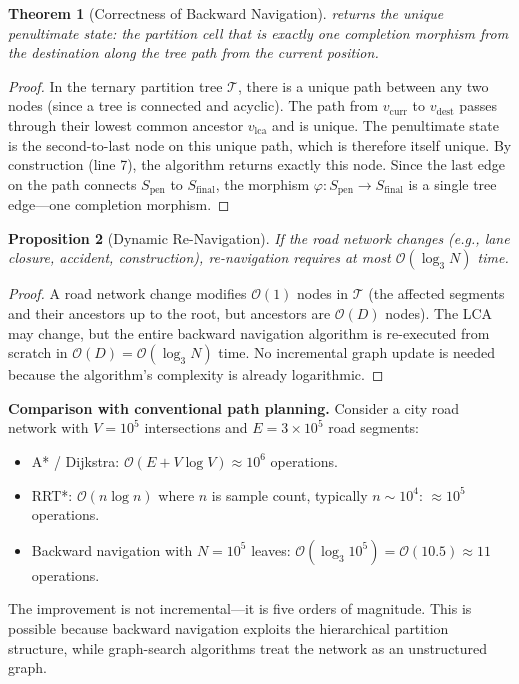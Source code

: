 \documentclass[twocolumn,10pt]{article}
\newtheorem{theorem}{Theorem}[section]
\newtheorem{proposition}[theorem]{Proposition}
\theoremstyle{definition}
\newcommand{\Sfinal}{S_{\mathrm{final}}}
\newcommand{\Spen}{S_{\mathrm{pen}}}
\newcommand{\BigO}{\mathcal{O}}
\begin{document}
\begin{theorem}[Correctness of Backward Navigation]
\label{thm:nav-correctness}
 returns the unique penultimate state: the partition cell that is exactly one completion morphism from the destination along the tree path from the current position.
\end{theorem}

\begin{proof}
In the ternary partition tree $\mathcal{T}$, there is a unique path between any two nodes (since a tree is connected and acyclic). The path from $v_{\mathrm{curr}}$ to $v_{\mathrm{dest}}$ passes through their lowest common ancestor $v_{\mathrm{lca}}$ and is unique. The penultimate state is the second-to-last node on this unique path, which is therefore itself unique. By construction (line 7), the algorithm returns exactly this node. Since the last edge on the path connects $\Spen$ to $\Sfinal$, the morphism $\varphi: \Spen \to \Sfinal$ is a single tree edge---one completion morphism.
\end{proof}

\begin{proposition}[Dynamic Re-Navigation]
\label{prop:dynamic-renav}
If the road network changes (e.g., lane closure, accident, construction), re-navigation requires at most $\BigO(\log_3 N)$ time.
\end{proposition}

\begin{proof}
A road network change modifies $\BigO(1)$ nodes in $\mathcal{T}$ (the affected segments and their ancestors up to the root, but ancestors are $\BigO(D)$ nodes). The LCA may change, but the entire backward navigation algorithm is re-executed from scratch in $\BigO(D) = \BigO(\log_3 N)$ time. No incremental graph update is needed because the algorithm's complexity is already logarithmic.
\end{proof}

\textbf{Comparison with conventional path planning.} Consider a city road network with $V = 10^5$ intersections and $E = 3 \times 10^5$ road segments:
\begin{itemize}[leftmargin=*]
\item A* / Dijkstra: $\BigO(E + V \log V) \approx 10^6$ operations.
\item RRT*: $\BigO(n \log n)$ where $n$ is sample count, typically $n \sim 10^4$: $\approx 10^5$ operations.
\item Backward navigation with $N = 10^5$ leaves: $\BigO(\log_3 10^5) = \BigO(10.5) \approx 11$ operations.
\end{itemize}
The improvement is not incremental---it is five orders of magnitude. This is possible because backward navigation exploits the hierarchical partition structure, while graph-search algorithms treat the network as an unstructured graph.
\end{document}
